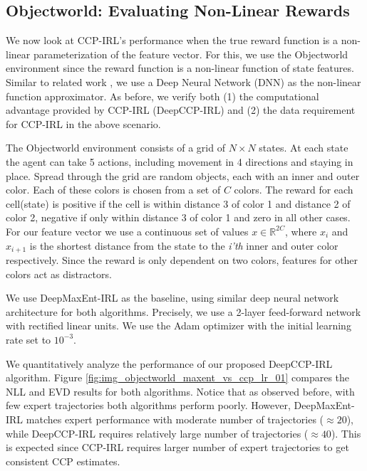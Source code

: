 \documentclass{article}
\begin{document}
\subsection{Objectworld: Evaluating Non-Linear Rewards}

We now look at CCP-IRL's performance when the true reward function is a non-linear parameterization of the feature vector.
For this, we use the Objectworld \cite{levine2011nonlinear} environment since the reward function is a non-linear function of state features.
Similar to related work \cite{wulfmeier2015maximum}, we use a Deep Neural Network (DNN) as the non-linear function approximator.
As before, we verify both (1) the computational advantage provided by CCP-IRL (DeepCCP-IRL) and (2) the data requirement for CCP-IRL in the above scenario.

The Objectworld environment consists of a grid of $N \times N$ states. At each state the agent can take 5 actions, including movement in 4 directions and staying in place. Spread through the grid are random objects, each with an inner and outer color. Each of these colors is chosen from a set of $C$ colors. The reward for each cell(state) is positive if the cell is within distance 3 of color 1 and distance 2 of color 2, negative if only within distance 3 of color 1 and zero in all other cases. For our feature vector we use a continuous set of values $x \in \mathbb{R}^{2C}$, where $x_i$ and $x_{i+1}$ is the shortest distance from the state to the \emph{i'th} inner and outer color respectively. Since the reward is only dependent on two colors, features for other colors act as distractors. 

We use DeepMaxEnt-IRL \cite{wulfmeier2015maximum} as the baseline, using similar deep neural network architecture for both algorithms. Precisely, we use a 2-layer feed-forward network with rectified linear units. We use the Adam \cite{kingma2014adam} optimizer with the initial learning rate set to $10^{-3}$.

We quantitatively analyze the performance of our proposed DeepCCP-IRL algorithm. 
Figure \ref{fig:img_objectworld_maxent_vs_ccp_lr_01} compares the NLL and EVD results for both algorithms. Notice that as observed before, with few expert trajectories both algorithms perform poorly. However, DeepMaxEnt-IRL matches expert performance with moderate number of trajectories ($\approx 20$), while DeepCCP-IRL requires relatively large number of trajectories ($\approx 40$).
This is expected since CCP-IRL requires larger number of expert trajectories to get consistent CCP estimates.
\end{document}
